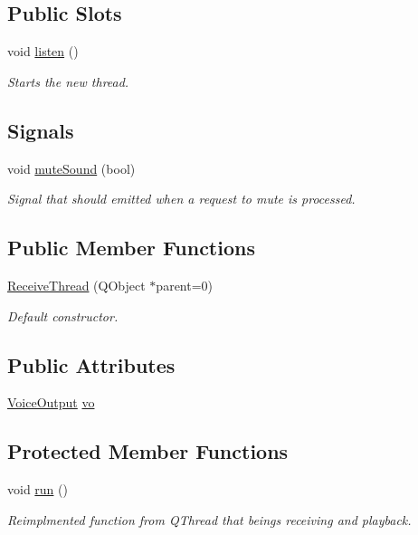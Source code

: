 \subsection*{\-Public \-Slots}
\begin{DoxyCompactItemize}
\item 
void \hyperlink{class_receive_thread_a0eb5b7ab172cf0a35fee1e499d1a04e2}{listen} ()
\begin{DoxyCompactList}\small\item\em \-Starts the new thread. \end{DoxyCompactList}\end{DoxyCompactItemize}
\subsection*{\-Signals}
\begin{DoxyCompactItemize}
\item 
void \hyperlink{class_receive_thread_a971403a676eb058555b5099f04a5b546}{mute\-Sound} (bool)
\begin{DoxyCompactList}\small\item\em \-Signal that should emitted when a request to mute is processed. \end{DoxyCompactList}\end{DoxyCompactItemize}
\subsection*{\-Public \-Member \-Functions}
\begin{DoxyCompactItemize}
\item 
\hyperlink{class_receive_thread_a7d3037d96e9f4f93850026dca7ff0787}{\-Receive\-Thread} (\-Q\-Object $\ast$parent=0)
\begin{DoxyCompactList}\small\item\em \-Default constructor. \end{DoxyCompactList}\end{DoxyCompactItemize}
\subsection*{\-Public \-Attributes}
\begin{DoxyCompactItemize}
\item 
\hyperlink{class_voice_output}{\-Voice\-Output} \hyperlink{class_receive_thread_ab1d07e023e07536515ae30c8991822a7}{vo}
\end{DoxyCompactItemize}
\subsection*{\-Protected \-Member \-Functions}
\begin{DoxyCompactItemize}
\item 
void \hyperlink{class_receive_thread_a5033e892e97f8fe46d25c5da6bd15674}{run} ()
\begin{DoxyCompactList}\small\item\em \-Reimplmented function from \-Q\-Thread that beings receiving and playback. \end{DoxyCompactList}\end{DoxyCompactItemize}


